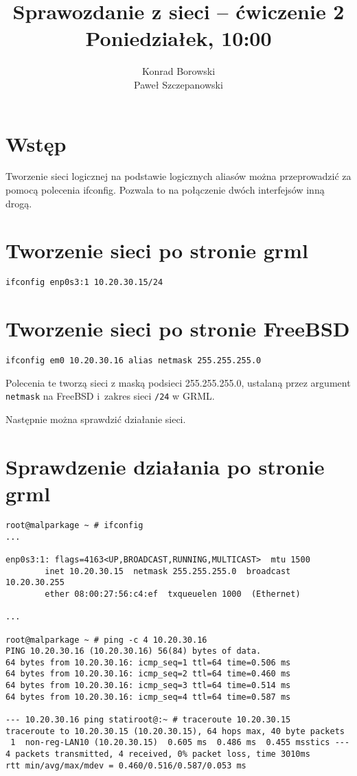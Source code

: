 \documentclass[a4paper,11pt]{article}
\title{Sprawozdanie z sieci -- ćwiczenie 2\\Poniedziałek, 10:00}
\author{Konrad Borowski\\Paweł Szczepanowski}
\begin{document}
\thispagestyle{empty}                   %

\maketitle

\section{Wstęp}

Tworzenie sieci logicznej na podstawie logicznych aliasów można
przeprowadzić za pomocą polecenia ifconfig. Pozwala to na połączenie
dwóch interfejsów inną drogą.

\section{Tworzenie sieci po stronie grml}

\begin{verbatim}
ifconfig enp0s3:1 10.20.30.15/24
\end{verbatim}

\section{Tworzenie sieci po stronie FreeBSD}

\begin{verbatim}
ifconfig em0 10.20.30.16 alias netmask 255.255.255.0
\end{verbatim}

Polecenia te tworzą sieci z maską podsieci 255.255.255.0, ustalaną przez
argument \verb|netmask| na FreeBSD i~zakres sieci \verb|/24| w GRML.

Następnie można sprawdzić działanie sieci.

\section{Sprawdzenie działania po stronie grml}

\begin{verbatim}
root@malparkage ~ # ifconfig
...

enp0s3:1: flags=4163<UP,BROADCAST,RUNNING,MULTICAST>  mtu 1500
        inet 10.20.30.15  netmask 255.255.255.0  broadcast 10.20.30.255
        ether 08:00:27:56:c4:ef  txqueuelen 1000  (Ethernet)

...

root@malparkage ~ # ping -c 4 10.20.30.16
PING 10.20.30.16 (10.20.30.16) 56(84) bytes of data.
64 bytes from 10.20.30.16: icmp_seq=1 ttl=64 time=0.506 ms
64 bytes from 10.20.30.16: icmp_seq=2 ttl=64 time=0.460 ms
64 bytes from 10.20.30.16: icmp_seq=3 ttl=64 time=0.514 ms
64 bytes from 10.20.30.16: icmp_seq=4 ttl=64 time=0.587 ms

--- 10.20.30.16 ping statiroot@:~ # traceroute 10.20.30.15
traceroute to 10.20.30.15 (10.20.30.15), 64 hops max, 40 byte packets
 1  non-reg-LAN10 (10.20.30.15)  0.605 ms  0.486 ms  0.455 msstics ---
4 packets transmitted, 4 received, 0% packet loss, time 3010ms
rtt min/avg/max/mdev = 0.460/0.516/0.587/0.053 ms
\end{verbatim}
\end{document}
